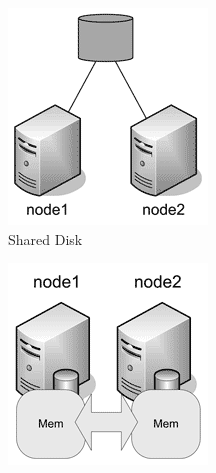 \begin{figure}[h]
	\centering
	\begin{subfigure}[b]{0.2\textwidth}
		\includegraphics[width=\textwidth]{7/07_01.png}
		\caption{Shared Disk}
		\label{fig:my_label1}
	\end{subfigure}
	\hfill
	\begin{subfigure}[b]{0.2\textwidth}
		\includegraphics[width=\textwidth]{7/07_02.png}

\end{subfigure}
\end{figure}
